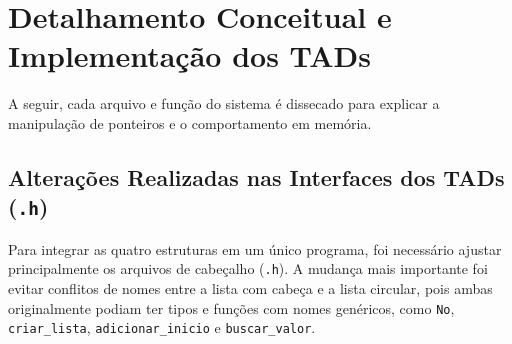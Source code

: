 \documentclass[11pt,a4paper]{article}
\begin{document}
\newpage

\section{Detalhamento Conceitual e Implementação dos TADs}

A seguir, cada arquivo e função do sistema é dissecado para explicar a manipulação de ponteiros e o comportamento em memória.

\subsection{Alterações Realizadas nas Interfaces dos TADs (\texttt{.h})}

Para integrar as quatro estruturas em um único programa, foi necessário ajustar principalmente os arquivos de cabeçalho (\texttt{.h}). A mudança mais importante foi evitar conflitos de nomes entre a lista com cabeça e a lista circular, pois ambas originalmente podiam ter tipos e funções com nomes genéricos, como \texttt{No}, \texttt{criar\_lista}, \texttt{adicionar\_inicio} e \texttt{buscar\_valor}.
\end{document}
